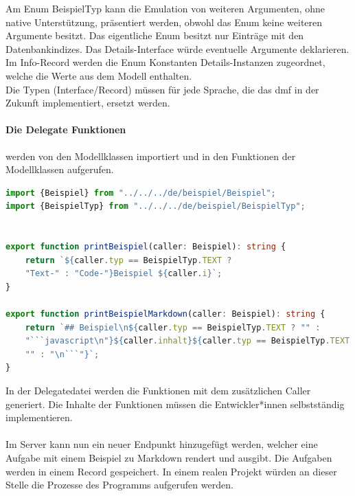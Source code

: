 \documentclass[./einleitung.tex]{subfiles}
\begin{document}
    Am Enum BeispielTyp kann die Emulation von weiteren Argumenten, ohne native Unterstützung, präsentiert werden, obwohl das Enum keine weiteren Argumente besitzt.
    Das eigentliche Enum besitzt nur Einträge mit den Datenbankindizes.
    Das Details-Interface würde eventuelle Argumente deklarieren.
    Im Info-Record werden die Enum Konstanten Details-Instanzen zugeordnet, welche die Werte aus dem Modell enthalten.\\
    Die Typen (Interface/Record) müssen für jede Sprache, die das \acrshort{dmf} in der Zukunft implementiert, ersetzt werden.
    
    \paragraph{Die Delegate Funktionen} werden von den Modellklassen importiert und in den Funktionen der Modellklassen aufgerufen.
    \begin{lstlisting}[language=Typescript, caption=BeispielDelegate.ts, label=lst:beispielDelegateTs]
import {Beispiel} from "../../../de/beispiel/Beispiel";
import {BeispielTyp} from "../../../de/beispiel/BeispielTyp";


export function printBeispiel(caller: Beispiel): string {
    return `${caller.typ == BeispielTyp.TEXT ?
    "Text-" : "Code-"}Beispiel ${caller.i}`;
}

export function printBeispielMarkdown(caller: Beispiel): string {
    return `## Beispiel\n${caller.typ == BeispielTyp.TEXT ? "" :
    "```javascript\n"}${caller.inhalt}${caller.typ == BeispielTyp.TEXT ?
    "" : "\n```"}`;
}
    \end{lstlisting}
    In der Delegatedatei werden die Funktionen mit dem zusätzlichen Caller generiert.
    Die Inhalte der Funktionen müssen die Entwickler*innen selbstständig implementieren.
    \\\\
    Im Server kann nun ein neuer Endpunkt hinzugefügt werden, welcher eine Aufgabe mit einem Beispiel zu Markdown rendert und ausgibt.
    Die Aufgaben werden in einem Record gespeichert.
    In einem realen Projekt würden an dieser Stelle die Prozesse des Programms aufgerufen werden.
\end{document}
